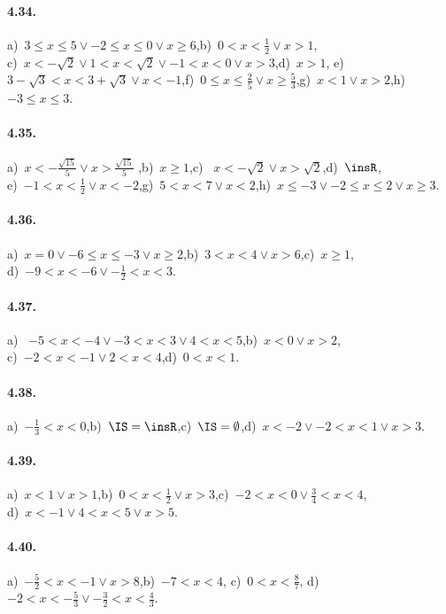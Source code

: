 \paragraph{4.34.} a)~$3\le x\le 5\vee -2\le x\le 0\vee x\ge 6$,\quad b)~$0<x<\frac 1 2\vee x>1$,\protect\\
c)~$x<-\sqrt 2\vee 1<x<\sqrt 2\vee -1<x<0\vee x>3$,\quad d)~$x>1$,\quad
e)~$3-\sqrt 3<x<3+\sqrt 3\vee x<-1$,\quad f)~$0\le x\le \frac 2 5\vee x\ge \frac 5 3$,\quad g)~$x<1\vee x>2$,\quad h)~$-3\le x\le 3$.

\paragraph{4.35.} a)~$x<-\frac{\sqrt{15}} 5\vee x>\frac{\sqrt{15}} 5$ ,\quad b)~$x\ge 1$,\quad c)~ $x<-\sqrt 2\vee x>\sqrt 2$,\quad d)~$\insR$,\protect\\
e)~$-1<x<\frac 1 2\vee x<-2$,\quad g)~$5<x<7\vee x<2$,\quad h)~$x\le -3\vee -2\le x\le 2\vee x\ge 3$.

\paragraph{4.36.} a)~$x=0\vee -6\le x\le -3\vee x\ge 2$,\quad b)~$3<x<4\vee x>6$,\quad c)~$x\ge 1$,\protect\\
d)~$-9<x<-6\vee -\frac 1 2<x<3$.

\paragraph{4.37.} a)~ $-5<x<-4\vee -3<x<3\vee 4<x<5$,\quad b)~$x<0\vee x>2$,\protect\\
c)~$-2<x<-1\vee 2<x<4$,\quad d)~$0<x<1$.

\paragraph{4.38.} a)~$-\frac 1 3<x<0$,\quad b)~$\IS=\insR$,\quad c)~$\IS=\emptyset $,\quad d)~$x<-2\vee -2<x<1\vee x>3$.

\paragraph{4.39.} a)~$x<1\vee x>1$,\quad b)~$0<x<\frac 1 2\vee x>3$,\quad c)~$-2<x<0\vee \frac 3 4<x<4$,\protect\\
d)~$x<-1\vee 4<x<5\vee x>5$.

\paragraph{4.40.} a)~$-\frac 5 2<x<-1\vee x>8$,\quad b)~$-7<x<4$,\; c)~$0<x<\frac 8 7$,\; d)~$-2<x<-\frac 5 3\vee -\frac 3 2<x<\frac 4 3$.


